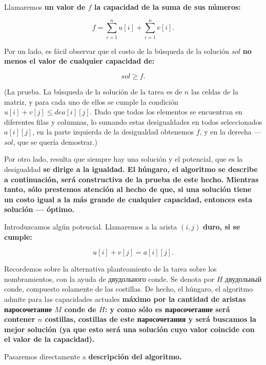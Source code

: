 Llamaremos \bf{un valor de $f$ la capacidad de} la suma de sus números:

$$ f = \sum_{i=1}^n u[i] + \sum_{i=1}^n v[i]. $$

Por un lado, es fácil observar que el costo de la búsqueda de la solución $sol$ \bf{no menos} el valor de cualquier capacidad de:

$$ sol \ge f. $$

(La prueba. La búsqueda de la solución de la tarea es de $n$ las celdas de la matriz, y para cada uno de ellos se cumple la condición $u[i] + v[j] \le de a[i][j]$. Dado que todos los elementos se encuentran en diferentes filas y columnas, lo sumando estas desigualdades en todos seleccionados $a[i][j]$, en la parte izquierda de la desigualdad obtenemos $f$, y en la derecha --- $sol$, que se quería demostrar.)

Por otro lado, resulta que siempre hay una solución y el potencial, que es la desigualdad \bf{se dirige a la igualdad}. El húngaro, el algoritmo se describe a continuación, será constructiva de la prueba de este hecho. Mientras tanto, sólo prestemos atención al hecho de que, si una solución tiene un costo igual a la más grande de cualquier capacidad, entonces esta solución --- \bf{óptimo}.

Introduzcamos algún potencial. Llamaremos a la arista $(i,j)$ \bf{duro}, si se cumple:

$$ u[i] + v[j] = a[i][j]. $$

Recordemos sobre la alternativa planteamiento de la tarea sobre los nombramientos, con la ayuda de двудольного conde. Se denota por $H$ двудольный conde, compuesto solamente de las costillas. De hecho, el húngaro, el algoritmo admite para las capacidades actuales \bf{máximo por la cantidad de aristas паросочетание $M$} conde de $H$: y como sólo es паросочетание será contener $n$ costillas, costillas de este паросочетания y será buscamos la mejor solución (ya que esto será una solución cuyo valor coincide con el valor de la capacidad).

Pasaremos directamente a \bf{descripción del algoritmo}.

